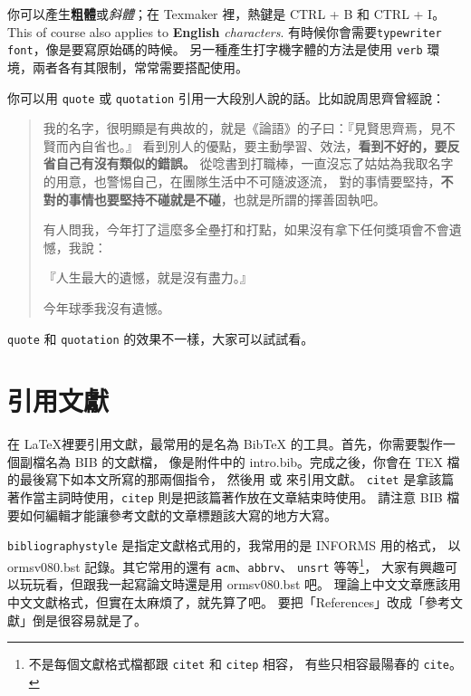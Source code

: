 \documentclass[12pt, a4paper]{article}
\begin{document}
你可以產生\textbf{粗體}或\textit{斜體}；在 Texmaker 裡，熱鍵是 CTRL + B 和 CTRL + I。
This of course also applies to \textbf{English} \textit{characters}. 
有時候你會需要\texttt{typewriter font}，像是要寫原始碼的時候。
另一種產生打字機字體的方法是使用 \verb|verb| 環境，兩者各有其限制，常常需要搭配使用。

你可以用 \verb|quote| 或 \verb|quotation| 引用一大段別人說的話。比如說周思齊曾經說：
\begin{quote}
我的名字，很明顯是有典故的，就是《論語》的子曰：『見賢思齊焉，見不賢而內自省也。』
看到別人的優點，要主動學習、效法，\textbf{看到不好的，要反省自己有沒有類似的錯誤。}
從唸書到打職棒，一直沒忘了姑姑為我取名字的用意，也警惕自己，在團隊生活中不可隨波逐流，
對的事情要堅持，\textbf{不對的事情也要堅持不碰就是不碰}，也就是所謂的擇善固執吧。

有人問我，今年打了這麼多全壘打和打點，如果沒有拿下任何獎項會不會遺憾，我說：
\begin{center}
『人生最大的遺憾，就是沒有盡力。』
\end{center}
今年球季我沒有遺憾。
\end{quote}
\verb|quote| 和 \verb|quotation| 的效果不一樣，大家可以試試看。












\section{引用文獻}

在 \LaTeX 裡要引用文獻，最常用的是名為 BibTeX 的工具。首先，你需要製作一個副檔名為 BIB 的文獻檔，
像是附件中的 intro.bib。完成之後，你會在 TEX 檔的最後寫下如本文所寫的那兩個指令，
然後用 \citet{Cachon05} 或 \citep{Hsiao13} 來引用文獻。
\verb|citet| 是拿該篇著作當主詞時使用，\verb|citep| 則是把該篇著作放在文章結束時使用。
請注意 BIB 檔要如何編輯才能讓參考文獻的文章標題該大寫的地方大寫。

\verb|bibliographystyle| 是指定文獻格式用的，我常用的是 INFORMS 用的格式，
以 ormsv080.bst 記錄。其它常用的還有 \verb|acm|、\verb|abbrv|、
\verb|unsrt| 等等\footnote{不是每個文獻格式檔都跟 \texttt{citet} 和 \texttt{citep} 相容，
有些只相容最陽春的 \texttt{cite}。}，
大家有興趣可以玩玩看，但跟我一起寫論文時還是用 ormsv080.bst 吧。
理論上中文文章應該用中文文獻格式，但實在太麻煩了，就先算了吧。
要把「References」改成「參考文獻」倒是很容易就是了。
\end{document}
